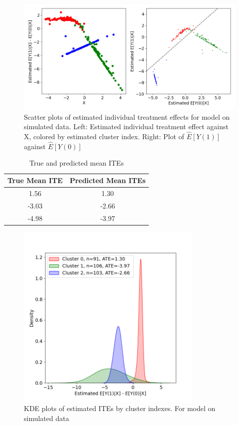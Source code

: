 \documentclass{article}
\begin{document}
\begin{appendices}
\begin{figure}[h]
  \centering
  \includegraphics[width=1\textwidth]{Plots/Simulated_output_scatted.png}
  \caption{Scatter plots of estimated individual treatment effects for model on simulated data. Left: Estimated individual treatment effect against X, colored by estimated cluster index. Right: Plot of $\hat{E}[Y(1)]$ against $\hat{E}[Y(0)]$}
  \label{fig:sim_scatter_plots}
\end{figure}

\begin{table}[h]
\centering
\begin{tabular}{cc}
\hline
True Mean ITE & Predicted Mean ITEs \\
\hline
1.56 & 1.30 \\
-3.03 & -2.66 \\
-4.98 & -3.97 \\
\hline
\end{tabular}
\caption{True and predicted mean ITEs}
\label{tab:simulated_ITEs}
\end{table}



\begin{figure}[h]
  \centering
  \includegraphics[width=0.8\textwidth]{Plots/Simulated_output_histogram.png}
  \caption{KDE plots of estimated ITEs by cluster indexes. For model on simulated data}
  \label{fig:sim_histo}
\end{figure}



\end{appendices}
\end{document}
